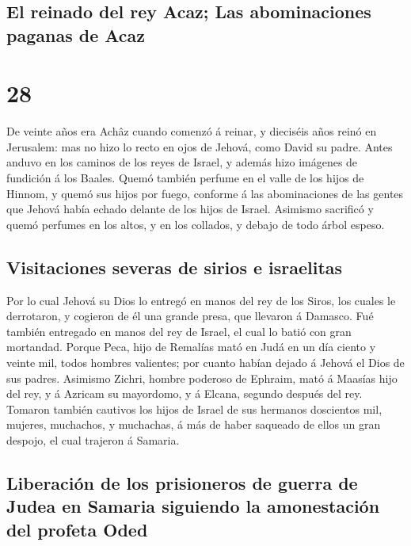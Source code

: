\hypertarget{el-reinado-del-rey-acaz-las-abominaciones-paganas-de-acaz}{%
\subsection{El reinado del rey Acaz; Las abominaciones paganas de
Acaz}\label{el-reinado-del-rey-acaz-las-abominaciones-paganas-de-acaz}}

\hypertarget{section-27}{%
\section{28}\label{section-27}}

 De veinte años era Achâz cuando comenzó á reinar, y
dieciséis años reinó en Jerusalem: mas no hizo lo recto en ojos de
Jehová, como David su padre.  Antes anduvo en los caminos de
los reyes de Israel, y además hizo imágenes de fundición á los Baales.
 Quemó también perfume en el valle de los hijos de Hinnom, y
quemó sus hijos por fuego, conforme á las abominaciones de las gentes
que Jehová había echado delante de los hijos de Israel. 
Asimismo sacrificó y quemó perfumes en los altos, y en los collados, y
debajo de todo árbol espeso.

\hypertarget{visitaciones-severas-de-sirios-e-israelitas}{%
\subsection{Visitaciones severas de sirios e
israelitas}\label{visitaciones-severas-de-sirios-e-israelitas}}

 Por lo cual Jehová su Dios lo entregó en manos del rey de
los Siros, los cuales le derrotaron, y cogieron de él una grande presa,
que llevaron á Damasco. Fué también entregado en manos del rey de
Israel, el cual lo batió con gran mortandad.  Porque Peca,
hijo de Remalías mató en Judá en un día ciento y veinte mil, todos
hombres valientes; por cuanto habían dejado á Jehová el Dios de sus
padres.  Asimismo Zichri, hombre poderoso de Ephraim, mató á
Maasías hijo del rey, y á Azricam su mayordomo, y á Elcana, segundo
después del rey.  Tomaron también cautivos los hijos de
Israel de sus hermanos doscientos mil, mujeres, muchachos, y muchachas,
á más de haber saqueado de ellos un gran despojo, el cual trajeron á
Samaria.

\hypertarget{liberaciuxf3n-de-los-prisioneros-de-guerra-de-judea-en-samaria-siguiendo-la-amonestaciuxf3n-del-profeta-oded}{%
\subsection{Liberación de los prisioneros de guerra de Judea en Samaria
siguiendo la amonestación del profeta
Oded}\label{liberaciuxf3n-de-los-prisioneros-de-guerra-de-judea-en-samaria-siguiendo-la-amonestaciuxf3n-del-profeta-oded}}

